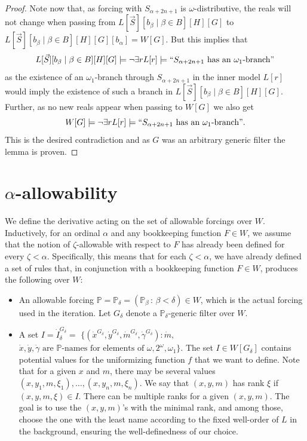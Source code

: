 \documentclass[a4paper,11pt]{article}
\newcommand{\forceP}{\mathbb{P}}
\begin{document}
\begin{proof}
Note now that, as forcing with $S_{\alpha+2n+1}$ is $\omega$-distributive, the reals will not change when passing from $L[\vec{S} ] [b_{\beta} \mid \beta \in B] [H] [G]$ to
$L[\vec{S} ] [b_{\beta} \mid \beta \in B] [H] [G] [b_{\alpha}]=W[G]$. 
 But this implies that 
\[L[\vec{S} ] [b_{\beta} \mid \beta \in B] [H] [G] \models \lnot \exists r L[r] \models `` S_{\alpha+2n+1} \text{ has an $\omega_1$-branch}" \]
as the existence of an $\omega_1$-branch through $S_{\alpha+2n+1}$ in the inner model $L[r]$ would imply the existence of such a branch in $L[\vec{S} ] [b_{\beta} \mid \beta \in B] [H] [G]$. Further, as no new reals appear when passing to $W[G]$ we also get 
\[W[G] \models \lnot \exists r L[r] \models `` S_{\alpha+2n+1} \text{ has an $\omega_1$-branch}". \]
This is the desired contradiction and as $G$ was an arbitrary generic filter the lemma is proven.

\end{proof}

\section{$\alpha$-allowability}

We define the derivative acting on the set of allowable forcings over \( W \). Inductively, for an ordinal \( \alpha \) and any bookkeeping function \( F \in W \), we assume that the notion of \( \zeta \)-allowable with respect to \( F \) has already been defined for every \( \zeta < \alpha \). Specifically, this means that for each \( \zeta < \alpha \), we have already defined a set of rules that, in conjunction with a bookkeeping function \( F \in W \), produces the following over \( W \):

\begin{itemize}
\item An allowable forcing \( \forceP = \forceP_{\delta} = (\forceP_{\beta} \, : \, \beta < \delta) \in W \), which is the actual forcing used in the iteration. Let \( G_{\delta} \) denote a \( \forceP_{\delta} \)-generic filter over \( W \).
  
\item A set \( I = \dot{I}_{\delta}^{G_{\delta}} = \) \( \{ (\dot{x}^{G_{\delta}}, \dot{y}^{G_{\delta}}, \dot{m}^{G_{\delta}}, \dot{\gamma}^{G_{\delta}}) : \dot{m} , \) \( \dot{x}, \dot{y}, \dot{\gamma} \text{ are } \forceP \text{-names for elements of } \omega, 2^{\omega}, \omega_1 \} \). The set \( I \in W[G_{\delta}] \) contains potential values for the uniformizing function \( f \) that we want to define. Note that for a given \( x \) and \( m \), there may be several values \( (x, y_1, m, \xi_1), \dots, (x, y_n, m, \xi_n) \). We say that \( (x, y, m) \) has rank \( \xi \) if \( (x, y, m, \xi) \in I \). There can be multiple ranks for a given \( (x, y, m) \). The goal is to use the \( (x, y, m) \)'s with the minimal rank, and among those, choose the one with the least name according to the fixed well-order of $L$ in the background, ensuring the well-definedness of our choice.
\end{itemize}
\end{document}
